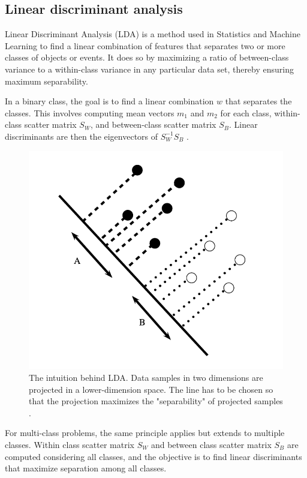         \subsection{Linear discriminant analysis}
            Linear Discriminant Analysis (LDA) is a method used in Statistics and Machine Learning to find a linear combination of features that separates two or more classes of objects or events. It does so by maximizing a ratio of between-class variance to a within-class variance in any particular data set, thereby ensuring maximum separability.

            In a binary class, the goal is to find a linear combination $w$ that separates the classes. This involves computing mean vectors $m_1$ and $m_2$ for each class, within-class scatter matrix $S_W$, and between-class scatter matrix $S_B$. Linear discriminants are then the eigenvectors of $S_W^{-1}S_B$ \cite{xanthopoulos_linear_2013}. 

            \begin{figure}[H]
                \centering
                \includegraphics[width=.6\textwidth]{../src/resources/images/models/lda.png}
                \caption{
                    The intuition behind LDA. Data samples in two dimensions are projected in a lower-dimension space. The line has to be chosen so that the projection maximizes the "separability" of projected samples \cite{xanthopoulos_linear_2013}.
                }
                \label{fig:linear_discriminant_analysis}
            \end{figure}

            For multi-class problems, the same principle applies but extends to multiple classes. Within class scatter matrix $S_W$ and between class scatter matrix $S_B$ are computed considering all classes, and the objective is to find linear discriminants that maximize separation among all classes.  

